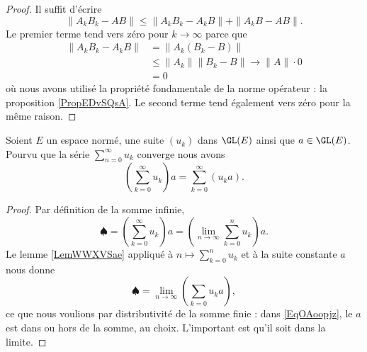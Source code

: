 \begin{proof}
    Il suffit d'écrire
    \begin{equation}
        \| A_kB_k-AB \|\leq \| A_kB_k-A_kB \|+\| A_kB-AB \|.
    \end{equation}
    Le premier terme tend vers zéro pour \( k\to\infty\) parce que 
    \begin{subequations}
        \begin{align}
            \| A_kB_k-A_kB \|&=\| A_k(B_k-B) \|\\
            &\leq \| A_k \|\| B_k-B \|\to \| A \|\cdot 0\\
            &=0
        \end{align}
    \end{subequations}
    où nous avons utilisé la propriété fondamentale de la norme opérateur : la proposition \ref{PropEDvSQsA}. Le second terme tend également vers zéro pour la même raison.
\end{proof}

\begin{proposition} \label{PropQXqEPuG}
    Soient \( E\) un espace normé, une suite \( (u_k)\) dans \( \GL(E)\) ainsi que \( a\in\GL(E)\). Pourvu que la série \( \sum_{n=0}^{\infty}u_k\) converge nous avons
    \begin{equation}
        \left( \sum_{k=0}^{\infty}u_k \right)a=\sum_{k=0}^{\infty}(u_ka).
    \end{equation}
\end{proposition}

\begin{proof}
    Par définition de la somme infinie,
    \begin{equation}
        \spadesuit=\left( \sum_{k=0}^{\infty}u_k \right)a=\left( \lim_{n\to \infty} \sum_{k=0}^nu_k \right)a.
    \end{equation}
    Le lemme \ref{LemWWXVSae} appliqué à \( n\mapsto\sum_{k=0}^nu_k\) et à la suite constante \( a\) nous donne
    \begin{equation}    \label{EqOAoopjz}
        \spadesuit=\lim_{n\to \infty} \left( \sum_{k=0}u_ka \right),
    \end{equation}
    ce que nous voulions par distributivité de la somme finie : dans \eqref{EqOAoopjz}, le \( a\) est dans ou hors de la somme, au choix. L'important est qu'il soit dans la limite.
\end{proof}


